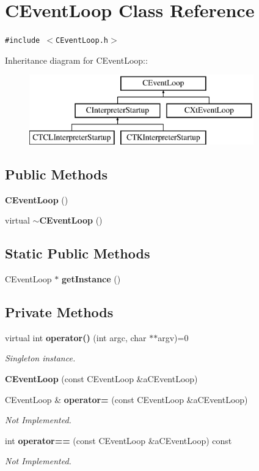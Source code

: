 \section{CEvent\-Loop  Class Reference}
\label{classCEventLoop}
{\tt \#include $<$CEvent\-Loop.h$>$}

Inheritance diagram for CEvent\-Loop::\begin{figure}[H]
\begin{center}
\leavevmode
\includegraphics[height=3cm]{classCEventLoop}
\end{center}
\end{figure}
\subsection*{Public Methods}
\begin{CompactItemize}
\item 
{\bf CEvent\-Loop} ()
\item 
virtual {\bf $\sim$CEvent\-Loop} ()
\end{CompactItemize}
\subsection*{Static Public Methods}
\begin{CompactItemize}
\item 
CEvent\-Loop $\ast$ {\bf get\-Instance} ()
\end{CompactItemize}
\subsection*{Private Methods}
\begin{CompactItemize}
\item 
virtual int {\bf operator()} (int argc, char $\ast$$\ast$argv)=0
\begin{CompactList}\small\item\em Singleton instance.\item\end{CompactList}\item 
{\bf CEvent\-Loop} (const CEvent\-Loop \&a\-CEvent\-Loop)
\item 
CEvent\-Loop \& {\bf operator=} (const CEvent\-Loop \&a\-CEvent\-Loop)
\begin{CompactList}\small\item\em Not Implemented.\item\end{CompactList}\item 
int {\bf operator==} (const CEvent\-Loop \&a\-CEvent\-Loop) const
\begin{CompactList}\small\item\em Not Implemented.\item\end{CompactList}\end{CompactItemize}
